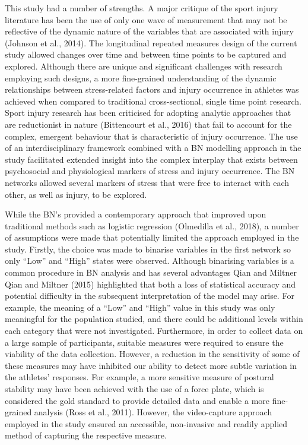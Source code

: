 \documentclass[
  english,
  man,floatsintext]{apa6}
\begin{document}
This study had a number of strengths. A major critique of the sport injury literature has been the use of only one wave of measurement that may not be reflective of the dynamic nature of the variables that are associated with injury (Johnson et al., 2014).
The longitudinal repeated measures design of the current study allowed changes over time and between time points to be captured and explored.
Although there are unique and significant challenges with research employing such designs, a more fine-grained understanding of the dynamic relationships between stress-related factors and injury occurrence in athletes was achieved when compared to traditional cross-sectional, single time point research.
Sport injury research has been criticised for adopting analytic approaches that are reductionist in nature (Bittencourt et al., 2016) that fail to account for the complex, emergent behaviour that is characteristic of injury occurrence. The use of an interdisciplinary framework combined with a BN modelling approach in the study facilitated extended insight into the complex interplay that exists between psychosocial and physiological markers of stress and injury occurrence.
The BN networks allowed several markers of stress that were free to interact with each other, as well as injury, to be explored.

While the BN's provided a contemporary approach that improved upon traditional methods such as logistic regression (Olmedilla et al., 2018), a number of assumptions were made that potentially limited the approach employed in the study.
Firstly, the choice was made to binarise variables in the first network so only ``Low'' and ``High'' states were observed. Although binarising variables is a common procedure in BN analysis and has several advantages Qian and Miltner Qian and Miltner (2015) highlighted that both a loss of statistical accuracy and potential difficulty in the subsequent interpretation of the model may arise.
For example, the meaning of a ``Low'' and ``High'' value in this study was only meaningful for the population studied, and there could be additional levels within each category that were not investigated.
Furthermore, in order to collect data on a large sample of participants, suitable measures were required to ensure the viability of the data collection. However, a reduction in the sensitivity of some of these measures may have inhibited our ability to detect more subtle variation in the athletes' responses.
For example, a more sensitive measure of postural stability may have been achieved with the use of a force plate, which is considered the gold standard to provide detailed data and enable a more fine-grained analysis (Ross et al., 2011).
However, the video-capture approach employed in the study ensured an accessible, non-invasive and readily applied method of capturing the respective measure.
\end{document}
